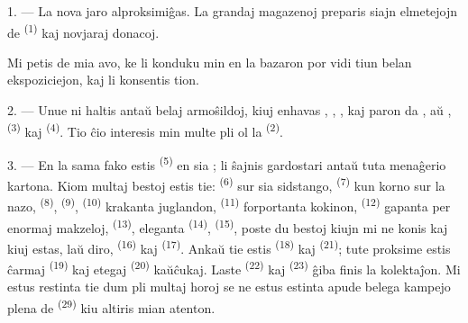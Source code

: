 %
%

\VUsaut{4.0mm}
\VUsaut{2.0mm}
\VUsaut{3.4mm}

1. --- La nova jaro alproksimiĝas. La grandaj magazenoj preparis siajn
elmetejojn de  \textsuperscript{(1)} kaj novjaraj donacoj.

Mi petis de mia avo, ke li konduku min en la bazaron por vidi tiun belan
ekspoziciejon, kaj li konsentis tion.

2. --- Unue ni haltis antaŭ belaj armoŝildoj, kiuj enhavas ,
, ,  kaj paron da
, aŭ ,  \textsuperscript{(3)}
kaj  \textsuperscript{(4)}. Tio ĉio interesis min multe pli ol
la  \textsuperscript{(2)}.

\VUsaut{3.0mm}
\VUsaut{2.6mm}

3. --- En la sama fako estis  \textsuperscript{(5)} en sia
; li ŝajnis gardostari antaŭ tuta menaĝerio kartona. Kiom
multaj bestoj estis tie:  \textsuperscript{(6)} sur sia
sidstango,  \textsuperscript{(7)} kun korno sur la nazo,
 \textsuperscript{(8)},  \textsuperscript{(9)},
 \textsuperscript{(10)} krakanta juglandon, 
\textsuperscript{(11)} forportanta kokinon, 
\textsuperscript{(12)} gapanta per enormaj makzeloj, 
\textsuperscript{(13)}, eleganta  \textsuperscript{(14)},
 \textsuperscript{(15)}, poste du bestoj kiujn mi ne konis kaj
kiuj estas, laŭ diro,  \textsuperscript{(16)} kaj 
\textsuperscript{(17)}. Ankaŭ tie estis 
\textsuperscript{(18)} kaj  \textsuperscript{(21)}; tute proksime
estis ĉarmaj  \textsuperscript{(19)} kaj etegaj 
\textsuperscript{(20)} kaŭĉukaj. Laste 
\textsuperscript{(22)} kaj  \textsuperscript{(23)} ĝiba finis
la kolektaĵon. Mi estus restinta tie dum pli multaj horoj se ne estus estinta
apude belega kampejo plena de  \textsuperscript{(29)}
kiu altiris mian atenton.

